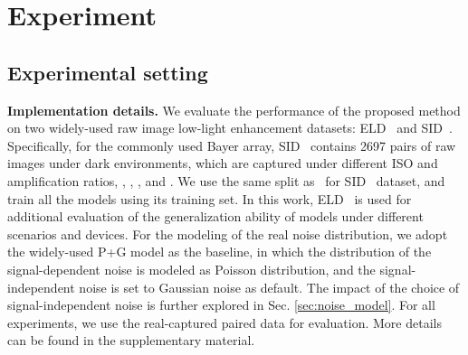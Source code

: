 \documentclass[10pt,twocolumn,letterpaper]{article}
\newcommand{\para}[1]{\noindent\textbf{#1}}
\begin{document}
\vspace{-0.1cm}
\section{Experiment}
\vspace{-0.1cm}
\subsection{Experimental setting}
\para{Implementation details.}
We evaluate the performance of the proposed method on two widely-used raw image low-light enhancement datasets: ELD~\cite{wei2020physics} and SID~\cite{chen2018learning}. Specifically, for the commonly used Bayer array, SID~\cite{chen2018learning} contains 2697 pairs of raw images under dark environments, which are captured under different ISO and amplification ratios, \eg, , , and . We use the same split as~\cite{wei2020physics} for SID~\cite{chen2018learning} dataset, and train all the models using its training set. In this work, ELD~\cite{wei2020physics} is used for additional evaluation of the generalization ability of models under different scenarios and devices.
For the modeling of the real noise distribution, we adopt the widely-used P+G model \cite{foi2008practical, wei2020physics} as the baseline, in which the distribution of the signal-dependent noise is modeled as Poisson distribution, and the signal-independent noise is set to Gaussian noise as default. 
The impact of the choice of signal-independent noise is further explored in Sec. 
\ref{sec:noise_model}. For all experiments, we use the real-captured paired data for evaluation. More details can be found in the supplementary material.
\end{document}

